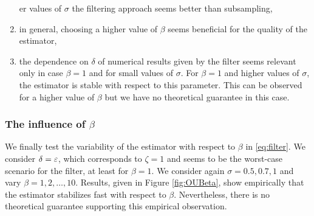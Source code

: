 \documentclass[10pt]{article}
\begin{document}
\begin{enumerate}
er values of $\sigma$ the filtering approach seems better than subsampling, 
	\item in general, choosing a higher value of $\beta$ seems beneficial for the quality of the estimator,
	\item the dependence on $\delta$ of numerical results given by the filter seems relevant only in case $\beta = 1$ and for small values of $\sigma$. For $\beta = 1$ and higher values of $\sigma$, the estimator is stable with respect to this parameter. This can be observed for a higher value of $\beta$ but we have no theoretical guarantee in this case.
\end{enumerate}

\subsubsection{The influence of $\beta$}\label{sec:Num_Param3}
We finally test the variability of the estimator with respect to $\beta$ in \eqref{eq:filter}. We consider $\delta = \varepsilon$, which corresponds to $\zeta = 1$ and seems to be the worst-case scenario for the filter, at least for $\beta = 1$. We consider again $\sigma = 0.5, 0.7, 1$ and vary $\beta = 1, 2, \ldots, 10$. Results, given in Figure \ref{fig:OUBeta}, show empirically that the estimator stabilizes fast with respect to $\beta$. Nevertheless, there is no theoretical guarantee supporting this empirical observation.
\end{document}
